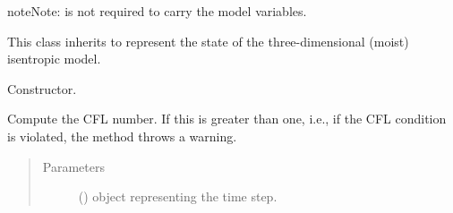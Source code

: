 \documentclass[letterpaper,10pt,english]{sphinxmanual}
\begin{document}
\begin{fulllineitems}
\begin{fulllineitems}
\begin{quote}
\begin{description}
\end{description}\end{quote}

\begin{sphinxadmonition}{note}{Note:}
 is not required to carry  the model variables.
\end{sphinxadmonition}

\end{fulllineitems}


\end{fulllineitems}


\begin{fulllineitems}
\label{\detokenize{api:storages.isentropic_state.IsentropicState}}
This class inherits {\hyperref[\detokenize{api:storages.grid_data.GridData}]{}} to represent the state of the three-dimensional
(moist) isentropic model.

\begin{fulllineitems}
\label{\detokenize{api:storages.isentropic_state.IsentropicState.__init__}}
Constructor.

\end{fulllineitems}


\begin{fulllineitems}
\label{\detokenize{api:storages.isentropic_state.IsentropicState.get_cfl}}
Compute the CFL number. If this is greater than one, i.e., if the CFL condition is violated,
the method throws a warning.
\begin{quote}\begin{description}
\item[{Parameters}] \leavevmode
{} () \textendash{}  object representing the time step.


\end{description}
\end{quote}
\end{fulllineitems}
\end{fulllineitems}
\end{document}
